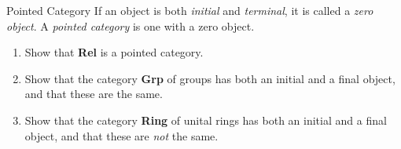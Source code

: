\begin{definition}{Pointed Category} If an object is both \emph{initial} and \emph{terminal}, it is called a \emph{zero object}. A \emph{pointed category} is one with a zero object.
\end{definition}

\begin{exercise}
  \begin{enumerate}
  \item Show that \textbf{Rel} is a pointed category.
  \item Show that the category \textbf{Grp} of groups has both an initial and a final object, and that these are the same.
  \item Show that the category \textbf{Ring} of unital rings has both an initial and a final object, and that these are \emph{not} the same.
  \end{enumerate}
\end{exercise}

